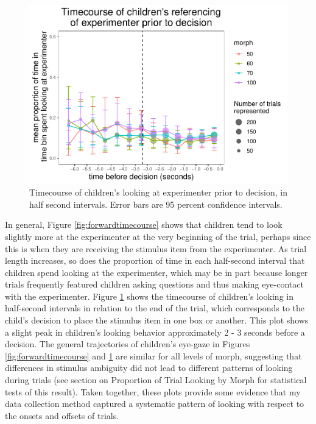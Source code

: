 \documentclass[,man,floatsintext]{apa6}
\begin{document}
\begin{figure}
\centering
\includegraphics{soc_ref_category_paper_files/figure-latex/reversetimecourse-1.pdf}
\caption{\label{fig:reversetimecourse}Timecourse of children's looking at experimenter prior to decision, in half second intervals. Error bars are 95 percent confidence intervals.}
\end{figure}

In general, Figure \ref{fig:forwardtimecourse} shows that children tend to look slightly more at the experimenter at the very beginning of the trial, perhaps since this is when they are receiving the stimulus item from the experimenter. As trial length increases, so does the proportion of time in each half-second interval that children spend looking at the experimenter, which may be in part because longer trials frequently featured children asking questions and thus making eye-contact with the experimenter. Figure \ref{fig:reversetimecourse} shows the timecourse of children's looking in half-second intervals in relation to the end of the trial, which corresponds to the child's decision to place the stimulus item in one box or another. This plot shows a slight peak in children's looking behavior approximately 2 - 3 seconds before a decision. The general trajectories of children's eye-gaze in Figures \ref{fig:forwardtimecourse} and \ref{fig:reversetimecourse} are similar for all levels of morph, suggesting that differences in stimulus ambiguity did not lead to different patterns of looking during trials (see section on Proportion of Trial Looking by Morph for statistical tests of this result). Taken together, these plots provide some evidence that my data collection method captured a systematic pattern of looking with respect to the onsets and offsets of trials.
\end{document}
